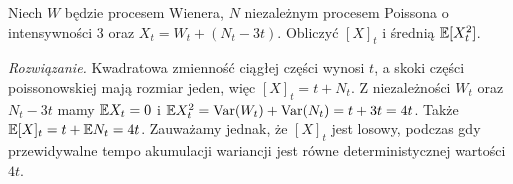 \begin{zadanie}
Niech $W$ będzie procesem Wienera, $N$ niezależnym
procesem Poissona o intensywności $3$ oraz
$X_t=W_t+(N_t-3t)$. Obliczyć $[X]_t$ i średnią
$\mathbb{E}[X_t^2]$.

\emph{Rozwiązanie.} Kwadratowa zmienność ciągłej części
wynosi $t$, a skoki części poissonowskiej mają rozmiar
jeden, więc $[X]_t=t+N_t$. Z niezależności
$W_t$ oraz $N_t-3t$ mamy
$\mathbb{E} X_t=0$ i
$\mathbb{E} X_t^2=\operatorname{Var}(W_t)+\operatorname{Var}(N_t)=t+3t=4t$.
Także $\mathbb{E}[X]_t=t+\mathbb{E} N_t=4t$.
Zauważamy jednak, że $[X]_t$ jest losowy, podczas
gdy przewidywalne tempo akumulacji wariancji jest
równe deterministycznej wartości $4t$.
\end{zadanie}


